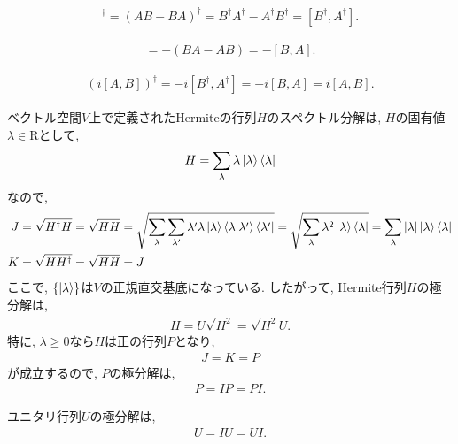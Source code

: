 \begin{ex}
    \label{ex2.45}
    \begin{align*}
        [A,B]^\dagger = (AB-BA)^\dagger = B^\dagger A^\dagger - A^\dagger B^\dagger = [B^\dagger, A^\dagger].
    \end{align*}
\end{ex}

\begin{ex}
    \label{ex2.46}
    \begin{align*}
        [A,B] = - (BA - AB) = -[B,A].
    \end{align*}
\end{ex}

\begin{ex}
    \label{ex2.47}
    \begin{align*}
        \left( i [A,B]\right)^\dagger
        =
        -i [B^\dagger, A^\dagger]
        =
        -i [B,A]
        =
        i [A,B].
    \end{align*}
\end{ex}

\begin{ex}
    \label{ex2.48}
    ベクトル空間$V$上で定義されたHermiteの行列$H$のスペクトル分解は, $H$の固有値$\lambda \in \mathrm{R}$として,
    \begin{align*}
        H = \sum_\lambda \lambda \ket{\lambda} \bra{\lambda}
    \end{align*}
    なので,
    \begin{align*}
        J & = \sqrt{H^\dagger H} = \sqrt{H H}
        = \sqrt{\sum_\lambda \sum_{\lambda'} \lambda' \lambda \ket{\lambda}\braket{\lambda|\lambda'}  \bra{\lambda'}}
        = \sqrt{\sum_\lambda \lambda^2 \ket{\lambda} \bra{\lambda}}
        = \sum_\lambda |\lambda| \ket{\lambda} \bra{\lambda} \\
        K & = \sqrt{HH^\dagger} = \sqrt{HH} = J
    \end{align*}
    ここで, $\{ \ket{\lambda} \}$は$V$の正規直交基底になっている. したがって,
    Hermite行列$H$の極分解は,
    \begin{align*}
        H = U \sqrt{H^2} = \sqrt{H^2} U .
    \end{align*}
    特に, $\lambda \geq 0$なら$H$は正の行列$P$となり,
    \begin{align*}
        J = K = P
    \end{align*}
    が成立するので, $P$の極分解は,
    \begin{align*}
        P = I P = P I .
    \end{align*}
    \par
    ユニタリ行列$U$の極分解は,
    \begin{align*}
        U = I U = U I .
    \end{align*}
    \par
\end{ex}

